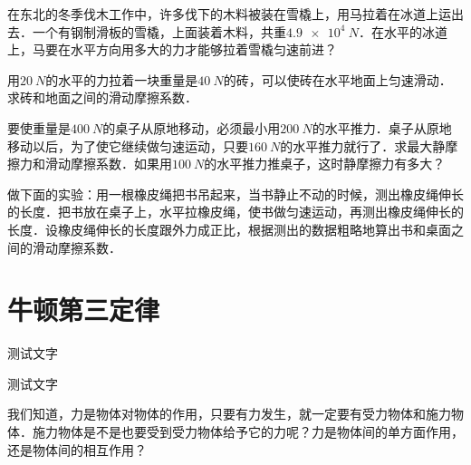 \begin{Exercise}
	\begin{QsNum}
	    \item  在东北的冬季伐木工作中，许多伐下的木料被装在雪橇上，用马拉着在冰道上运出去．一个有钢制滑板的雪橇，上面装着木料，共重$\qty{4.9e4}{N}$．在水平的冰道上，马要在水平方向用多大的力才能够拉着雪橇匀速前进？
	    \item  用$\qty{20}{N}$的水平的力拉着一块重量是$\qty{40}{N}$的砖，可以使砖在水平地面上匀速滑动．求砖和地面之间的滑动摩擦系数．
	    \item  要使重量是$\qty{400}{N}$的桌子从原地移动，必须最小用$\qty{200}{N}$的水平推力．桌子从原地移动以后，为了使它继续做匀速运动，只要$\qty{160}{N}$的水平推力就行了．求最大静摩擦力和滑动摩擦系数．如果用$\qty{100}{N}$的水平推力推桌子，这时静摩擦力有多大？
	    \item  做下面的实验：用一根橡皮绳把书吊起来，当书静止不动的时候，测出橡皮绳伸长的长度．把书放在桌子上，水平拉橡皮绳，使书做匀速运动，再测出橡皮绳伸长的长度．设橡皮绳伸长的长度跟外力成正比，根据测出的数据粗略地算出书和桌面之间的滑动摩擦系数．
    \end{QsNum}
\end{Exercise}





\section{牛顿第三定律}

\begin{Point*}
	测试文字
\end{Point*}

\begin{Case*}
	\item 测试文字
\end{Case*}



我们知道，力是物体对物体的作用，只要有力发生，就一定要有受力物体和施力物体．施力物体是不是也要受到受力物体给予它的力呢？力是物体间的单方面作用，还是物体间的相互作用？

